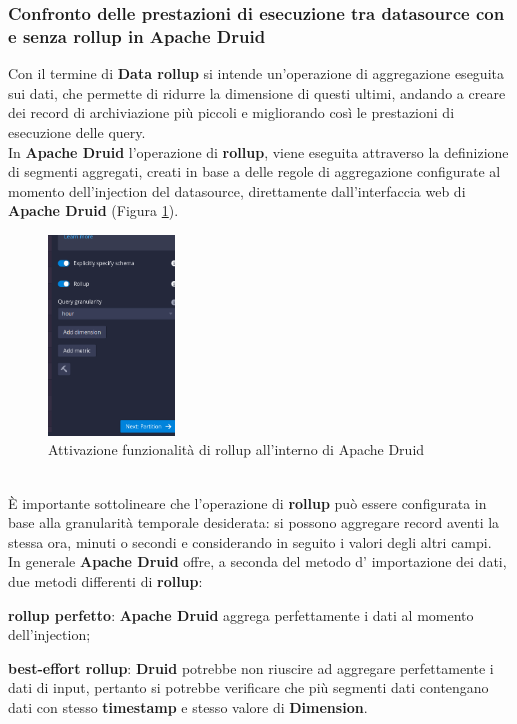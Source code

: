 \subsubsection{Confronto delle prestazioni di esecuzione tra datasource con e senza rollup in Apache Druid}\label{sec:confronto_prestazioni2}
Con il termine di \textbf{Data rollup} si intende un'operazione di aggregazione eseguita 
sui dati, che permette di ridurre la dimensione di questi ultimi, andando a creare dei record di archiviazione più piccoli e migliorando così 
le prestazioni di esecuzione delle query.\\
In \textbf{Apache Druid} l'operazione di \textbf{rollup}, viene eseguita attraverso la 
definizione di segmenti aggregati, creati in base a delle regole di aggregazione configurate al momento dell'\gls{injection}{} del \gls{datasource}{}, direttamente dall'interfaccia web di \textbf{Apache Druid} (Figura \ref{fig:rollup}).
\begin{figure}[h]
  \centering
  \includegraphics[width=0.3\textwidth]{images/percorso/test_rollup.png}
  \caption{Attivazione funzionalità di rollup all'interno di Apache Druid}
  \label{fig:rollup}
\end{figure}
\\
È importante sottolineare che l'operazione di \textbf{rollup} può essere configurata in base 
alla granularità temporale desiderata: si possono aggregare record aventi la stessa ora, minuti o secondi e considerando in seguito i  valori degli altri campi.\\
In generale \textbf{Apache Druid} offre, a seconda del metodo d' importazione dei dati, due metodi differenti di \textbf{rollup}:
\begin{list}{*}
  \item \textbf{rollup  perfetto}: \textbf{Apache Druid} aggrega perfettamente i dati al momento dell'\gls{injection}{};
  \item \item \textbf{best-effort rollup}: \textbf{Druid} potrebbe non riuscire ad aggregare perfettamente i dati 
  di input, pertanto si potrebbe verificare che più segmenti dati contengano dati con
  stesso \textbf{timestamp} e stesso valore di \textbf{Dimension}.
\end{list}
